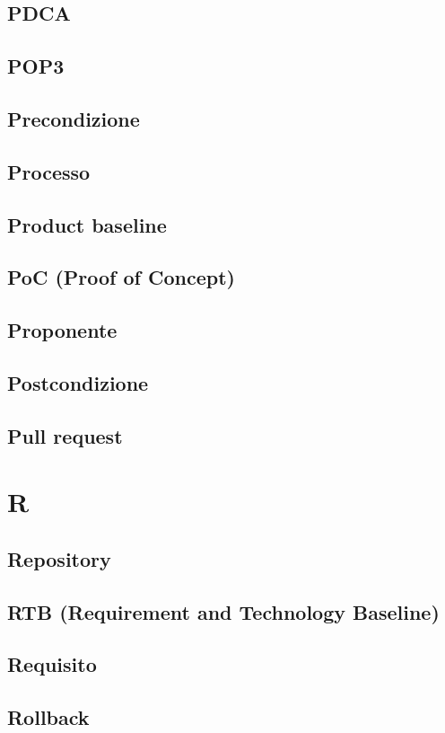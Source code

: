 \documentclass[12pt]{article}
\begin{document}
		\subsection{PDCA} %
		\subsection{POP3}
		\subsection{Precondizione}
		\subsection{Processo}
		\subsection{Product baseline}
		\subsection{PoC (Proof of Concept)}
		\subsection{Proponente}
		\subsection{Postcondizione}
		\subsection{Pull request}
	\clearpage
	\section{R}
		\subsection{Repository}
		\subsection{RTB (Requirement and Technology Baseline)}
		\subsection{Requisito}
		\subsection{Rollback}
\end{document}
